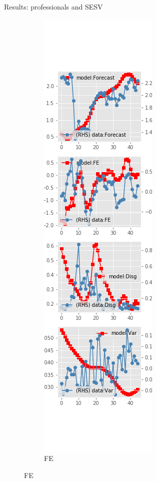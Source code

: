 \documentclass{beamer}
\begin{document}
\begin{frame}{Results: professionals and SESV}
\begin{figure}[ht]
\begin{subfigure}[b]{0.19\textwidth}
		\end{subfigure}
		\hfill
		\begin{subfigure}[b]{0.19\textwidth}
			\caption{FE}
			\includegraphics[width=\textwidth, height = 0.8\textheight]{figuresDraft/spf_se_est_sv_diag1.png}

\end{subfigure}
\end{figure}
\end{frame}
\end{document}
